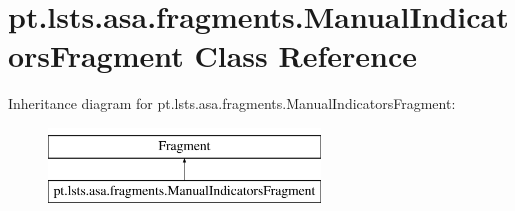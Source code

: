 \hypertarget{classpt_1_1lsts_1_1asa_1_1fragments_1_1ManualIndicatorsFragment}{}\section{pt.\+lsts.\+asa.\+fragments.\+Manual\+Indicators\+Fragment Class Reference}
\label{classpt_1_1lsts_1_1asa_1_1fragments_1_1ManualIndicatorsFragment}
Inheritance diagram for pt.\+lsts.\+asa.\+fragments.\+Manual\+Indicators\+Fragment\+:\begin{figure}[H]
\begin{center}
\leavevmode
\includegraphics[height=2.000000cm]{classpt_1_1lsts_1_1asa_1_1fragments_1_1ManualIndicatorsFragment}
\end{center}
\end{figure}
